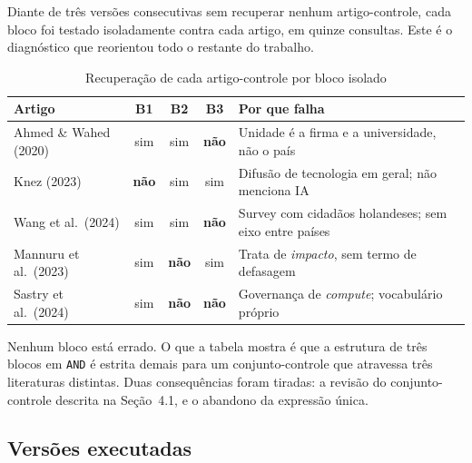 \documentclass[12pt,a4paper]{article}
\begin{document}
Diante de três versões consecutivas sem recuperar nenhum artigo-controle, cada bloco foi
testado isoladamente contra cada artigo, em quinze consultas. Este é o diagnóstico que
reorientou todo o restante do trabalho.

\begin{table}[htbp]
\centering\small
\caption{Recuperação de cada artigo-controle por bloco isolado}
\begin{tabularx}{\textwidth}{Y c c c Y}
\toprule
\textbf{Artigo} & \textbf{B1} & \textbf{B2} & \textbf{B3} & \textbf{Por que falha} \\
\midrule
Ahmed \& Wahed (2020) & sim & sim & \textbf{não} & Unidade é a firma e a universidade, não o país \\
Knez (2023)           & \textbf{não} & sim & sim & Difusão de tecnologia em geral; não menciona IA \\
Wang et al.\ (2024)   & sim & sim & \textbf{não} & Survey com cidadãos holandeses; sem eixo entre países \\
Mannuru et al.\ (2023)& sim & \textbf{não} & sim & Trata de \textit{impacto}, sem termo de defasagem \\
Sastry et al.\ (2024) & sim & \textbf{não} & \textbf{não} & Governança de \textit{compute}; vocabulário próprio \\
\bottomrule
\end{tabularx}
\end{table}

\noindent Nenhum bloco está errado. O que a tabela mostra é que a estrutura de três blocos
em \texttt{AND} é estrita demais para um conjunto-controle que atravessa três literaturas
distintas. Duas consequências foram tiradas: a revisão do conjunto-controle descrita na
Seção~4.1, e o abandono da expressão única.

\subsection{Versões executadas}
\end{document}
